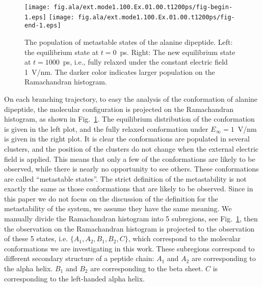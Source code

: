 \documentclass[aip,jcp,a4paper,preprint,onecolumn]{revtex4-1}
\begin{document}
\begin{figure}
  \centering
  \texttt{[image: fig.ala/ext.mode1.100.Ex.01.00.t1200ps/fig-begin-1.eps]}
  \texttt{[image: fig.ala/ext.mode1.100.Ex.01.00.t1200ps/fig-end-1.eps]}
  \caption{The population of metastable states of the alanine dipeptide.
    Left: the
    equilibrium state at $t=0$~\textsf{ps}. Right: The new equilibrium
    state at $t=1000$~\textsf{ps}, i.e., fully relaxed under the
    constant electric field 1~V/nm. The darker color
    indicates larger population on the Ramachandran histogram.}
  \label{fig:tmp4}
\end{figure}


On each branching trajectory, to easy the analysis of the conformation
of alanine dipeptide, the molecular configuration is projected on
the Ramachandran histogram, as
shown in Fig.~\ref{fig:tmp4}. The equilibrium distribution of the
conformation is given in the left plot, and the fully relaxed
conformation under $E_{\infty} = 1$~V/nm is given in the right plot.  It is
clear the conformations are populated in several clusters, and the
position of the clusters do not change when the external electric
field is applied.
This means that only a few of the conformations are likely to be observed,
while there is nearly no opportunity to see others. 
These conformations are called ``metastable states''.
The strict definition of the
metastability is not exactly the same as those conformations that are likely to be observed.
Since in this paper we do not focus on the discussion of the definition for the metastability of the system,
we assume they have the same meaning.
We manually divide the
Ramachandran histogram into 5 subregions, see Fig.~\ref{fig:tmp4},
then the observation on the Ramachandran histogram is projected to the
observation of these 5 states, i.e. $\{A_1, A_2, B_1, B_2, C\}$, which
correspond to the molecular conformations we are investigating in this work.
These subregions
correspond to different secondary structure of a peptide chain:
$A_1$ and $A_2$ are
corresponding to the alpha helix. $B_1$ and $B_2$ are
corresponding to the beta sheet. $C$ is corresponding to the
left-handed alpha helix.
\end{document}
